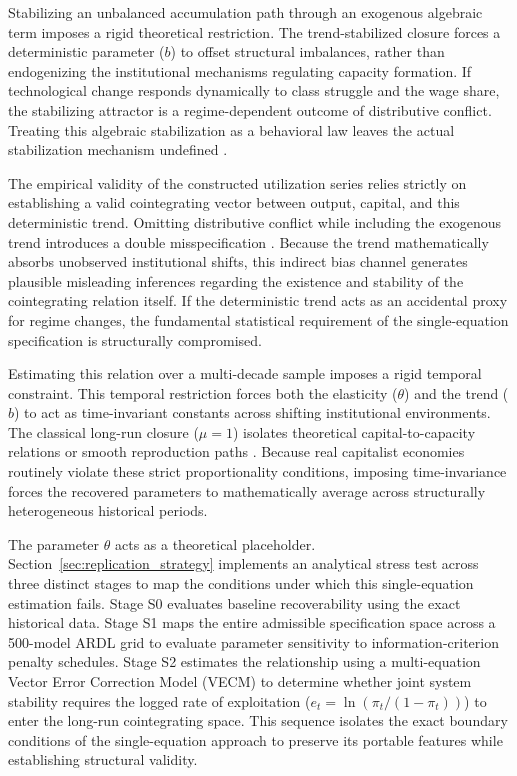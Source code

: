 \documentclass[11pt]{article}
\begin{document}
Stabilizing an unbalanced accumulation path through an exogenous algebraic term imposes a rigid theoretical restriction. The trend-stabilized closure forces a deterministic parameter ($b$) to offset structural imbalances, rather than endogenizing the institutional mechanisms regulating capacity formation. If technological change responds dynamically to class struggle and the wage share, the stabilizing attractor is a regime-dependent outcome of distributive conflict. Treating this algebraic stabilization as a behavioral law leaves the actual stabilization mechanism undefined \citep{Shaikh1974}.

The empirical validity of the constructed utilization series relies strictly on establishing a valid cointegrating vector between output, capital, and this deterministic trend. Omitting distributive conflict while including the exogenous trend introduces a double misspecification \citep{Basu2020}. Because the trend mathematically absorbs unobserved institutional shifts, this indirect bias channel generates plausible misleading inferences regarding the existence and stability of the cointegrating relation itself. If the deterministic trend acts as an accidental proxy for regime changes, the fundamental statistical requirement of the single-equation specification is structurally compromised.

Estimating this relation over a multi-decade sample imposes a rigid temporal constraint. This temporal restriction forces both the elasticity ($\theta$) and the trend ($b$) to act as time-invariant constants across shifting institutional environments. The classical long-run closure ($\mu = 1$) isolates theoretical capital-to-capacity relations \citep{Foley1985} or smooth reproduction paths \citep{Okishio2022, Basu2022}. Because real capitalist economies routinely violate these strict proportionality conditions, imposing time-invariance forces the recovered parameters to mathematically average across structurally heterogeneous historical periods.

The parameter $\theta$ acts as a theoretical placeholder. Section~\ref{sec:replication_strategy} implements an analytical stress test across three distinct stages to map the conditions under which this single-equation estimation fails. Stage S0 evaluates baseline recoverability using the exact historical data. Stage S1 maps the entire admissible specification space across a 500-model ARDL grid to evaluate parameter sensitivity to information-criterion penalty schedules. Stage S2 estimates the relationship using a multi-equation Vector Error Correction Model (VECM) to determine whether joint system stability requires the logged rate of exploitation ($e_t = \ln(\pi_t / (1 - \pi_t))$) to enter the long-run cointegrating space. This sequence isolates the exact boundary conditions of the single-equation approach to preserve its portable features while establishing structural validity.
\end{document}
